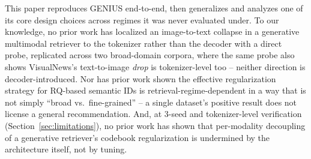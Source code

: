 This paper reproduces GENIUS end-to-end, then generalizes and analyzes one of its core design choices across regimes it was never evaluated under. To our knowledge, no prior work has localized an image-to-text collapse in a generative multimodal retriever to the tokenizer rather than the decoder with a direct probe, replicated across two broad-domain corpora, where the same probe also shows VisualNews's text-to-image \emph{drop} is tokenizer-level too -- neither direction is decoder-introduced. Nor has prior work shown the effective regularization strategy for RQ-based semantic IDs is retrieval-regime-dependent in a way that is not simply ``broad vs.\ fine-grained'' -- a single dataset's positive result does not license a general recommendation. And, at 3-seed and tokenizer-level verification (Section~\ref{sec:limitations}), no prior work has shown that per-modality decoupling of a generative retriever's codebook regularization is undermined by the architecture itself, not by tuning.
